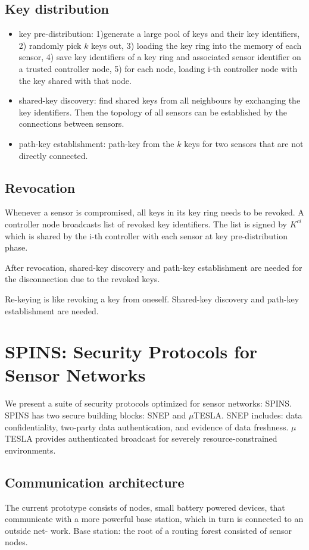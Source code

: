 \documentclass[]{article}
\begin{document}
\subsection{Key distribution}
\begin{itemize}
 \item key pre-distribution: 1)generate a large pool of keys and their
 key identifiers, 2) randomly pick $k$ keys out, 3) loading the key ring
 into the memory of each sensor, 4) save key identifiers of a key ring
 and associated sensor identifier on a trusted controller node, 5) for 
 each node, loading i-th controller node with the key shared with that 
 node. 
 \item shared-key discovery: find shared keys from all neighbours by
 exchanging the key identifiers. Then the topology of all sensors can 
 be established by the connections between sensors.
 \item path-key establishment: path-key from the $k$ keys for two 
 sensors that are not  directly connected.
\end{itemize}

\subsection{Revocation}
Whenever a sensor is compromised, all keys in its key ring needs to 
be revoked. A controller node broadcasts list of revoked key identifiers.
The list is signed by $K^{ci}$ which is shared by the i-th controller with
each sensor at key pre-distribution phase.

After revocation, shared-key discovery and path-key establishment 
are needed for the disconnection due to the revoked keys.

Re-keying is like revoking a key from oneself. Shared-key discovery
and path-key establishment are needed.


\section{SPINS: Security Protocols for Sensor Networks}
We present a suite of security protocols optimized for sensor 
networks: SPINS. SPINS has two secure building blocks: SNEP and 
$\mu$TESLA. SNEP includes: data confidentiality, two-party data 
authentication, and evidence of data freshness. $\mu$TESLA provides 
authenticated broadcast for severely resource-constrained environments.

\subsection{Communication architecture}
The current prototype consists of nodes, small battery powered devices,
that communicate with a more powerful base station, which in turn is 
connected to an outside net- work.
 Base station: the root of a routing forest consisted of sensor nodes.
 
\end{document}
